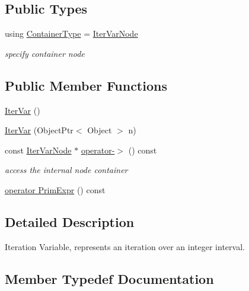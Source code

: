 \subsection*{Public Types}
\begin{DoxyCompactItemize}
\item 
using \hyperlink{classtvm_1_1tir_1_1IterVar_a9ae026083778f787e208be2aa8c89068}{Container\+Type} = \hyperlink{classtvm_1_1tir_1_1IterVarNode}{Iter\+Var\+Node}
\begin{DoxyCompactList}\small\item\em specify container node \end{DoxyCompactList}\end{DoxyCompactItemize}
\subsection*{Public Member Functions}
\begin{DoxyCompactItemize}
\item 
\hyperlink{classtvm_1_1tir_1_1IterVar_a8f7660471b10ccd8f55f4fe981ec6304}{Iter\+Var} ()
\item 
\hyperlink{classtvm_1_1tir_1_1IterVar_aebdc6fb885d22bd051a5c116995e617f}{Iter\+Var} (Object\+Ptr$<$ Object $>$ n)
\item 
const \hyperlink{classtvm_1_1tir_1_1IterVarNode}{Iter\+Var\+Node} $\ast$ \hyperlink{classtvm_1_1tir_1_1IterVar_a59e2517ff002cca47c94b1e98392a8e3}{operator-\/$>$} () const 
\begin{DoxyCompactList}\small\item\em access the internal node container \end{DoxyCompactList}\item 
\hyperlink{classtvm_1_1tir_1_1IterVar_af6dc89499fbef1b3a89453f0b23b12d4}{operator Prim\+Expr} () const 
\end{DoxyCompactItemize}


\subsection{Detailed Description}
Iteration Variable, represents an iteration over an integer interval. 

\subsection{Member Typedef Documentation}
